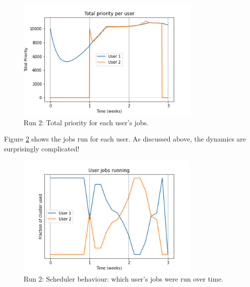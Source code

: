 \documentclass{article}
\begin{document}
\begin{figure}[h!!]
  \begin{center}
    \includegraphics[width=0.8\textwidth]{sim-2-prio}
  \end{center}
  \caption{Run 2: Total priority for each user's jobs.
    \label{fig:two-prio}}
\end{figure}

\clearpage
Figure \ref{fig:two-jobs} shows the jobs run for each user.
As discussed above, the dynamics are surprisingly complicated!
\begin{figure}[h!]
  \begin{center}
    \includegraphics[width=0.8\textwidth]{sim-2-ujobs}
  \end{center}
  \caption{Run 2: Scheduler behaviour: which user's jobs were run over time.
    \label{fig:two-jobs}}
\end{figure}
\end{document}
